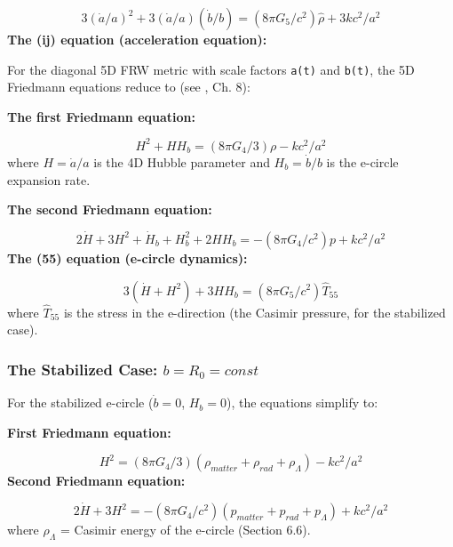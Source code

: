 \documentclass[aps,prd,preprint,superscriptaddress,longbibliography,floatfix]{revtex4-2}
\theoremstyle{remark}
\begin{document}
\begin{equation}
    3(\dot{a}/a)^{2} + 3(\dot{a}/a)(\dot{b}/b) = (8\pi G_{5}/c^{2}) \hat{\rho} + 3k c^{2}/a^{2}
\end{equation}
\textbf{The (ij) equation (acceleration equation):}

For the diagonal 5D FRW metric with scale factors \texttt{a(t)} and \texttt{b(t)}, the 5D Friedmann equations reduce to (see \cite{OverduinWesson1997}, Ch. 8):

\textbf{The first Friedmann equation:}


\begin{equation}
    H^{2} + H H_b = (8\pi G_{4}/3) \rho - kc^{2}/a^{2}
\end{equation}
where $H = \dot{a}/a$ is the 4D Hubble parameter and $H_b = \dot{b}/b$ is the e-circle expansion rate.

\textbf{The second Friedmann equation:}


\begin{equation}
    2\dot{H} + 3H^{2} + \dot{H}_b + H_b^{2} + 2H H_b = -(8\pi G_{4}/c^{2}) p + kc^{2}/a^{2}
\end{equation}
\textbf{The (55) equation (e-circle dynamics):}


\begin{equation}
    3(\dot{H} + H^{2}) + 3H H_b = (8\pi G_{5}/c^{2}) \hat{T}_{55}
\end{equation}
where $\hat{T}_{55}$ is the stress in the e-direction (the Casimir pressure, for the stabilized case).


\subsubsection{The Stabilized Case: $b = R_{0} = const$}

For the stabilized e-circle ($\dot{b} = 0$, $H_b = 0$), the equations simplify to:

\textbf{First Friedmann equation:}


\begin{equation}
    H^{2} = (8\pi G_{4}/3)(\rho_{matter} + \rho_{rad} + \rho_\Lambda) - kc^{2}/a^{2}
\end{equation}
\textbf{Second Friedmann equation:}


\begin{equation}
    2\dot{H} + 3H^{2} = -(8\pi G_{4}/c^{2})(p_{matter} + p_{rad} + p_\Lambda) + kc^{2}/a^{2}
\end{equation}
where $\rho_\Lambda$ = Casimir energy of the e-circle (Section 6.6).
\end{document}
